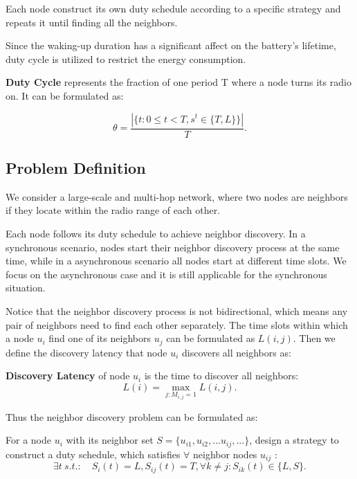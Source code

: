 Each node construct its own duty schedule according to a specific strategy and repeats it
until finding all the neighbors. 

Since the waking-up duration has a significant affect on the battery's lifetime, 
duty cycle is utilized to restrict the energy consumption.

\begin{definition}
\textbf{Duty Cycle} represents the fraction of one period T where a node turns its radio on. It can be formulated as:

$$\theta=\frac{|\{t: 0\leq t<T, s^t \in \{T,L\}\}|}{T}.
$$
\end{definition}  

\subsection{Problem Definition}

We consider a large-scale and multi-hop network, 
where two nodes are neighbors if they locate within the radio range of each other. 

Each node follows its duty schedule to achieve neighbor discovery. In a synchronous scenario,
nodes start their neighbor discovery process at the same time, while in a asynchronous  scenario
all nodes start at different time slots. We focus on the asynchronous case and it is still applicable for the
synchronous situation.

Notice that the neighbor discovery process is not bidirectional, which means any pair of neighbors 
need to find each other separately. The time slots within which a node $u_i$ find one of its neighbors $u_j$ can be formulated 
as $L(i,j)$. Then we define the discovery latency that node $u_i$ discovers all neighbors as:
\begin{definition}
\textbf{Discovery Latency} of node $u_i$ is the time to discover all neighbors:
$$L(i) = \max_{j:M_{i,j}=1} L(i,j).
$$
\end{definition}

Thus the neighbor discovery problem can be formulated as:
\begin{problem}
For a node $u_i$ with its neighbor set $S = \{u_{i1},u_{i2},...u_{ij},...\}$, 
design a strategy to construct a duty schedule, which satisfies
$\forall$ neighbor nodes $u_{ij}$ :
$$
\exists t \ s.t. :  \quad
S_i(t) = L ,
S_{ij}(t) = T,
\forall k \neq j : S_{ik}(t) \in \{L, S\}.
$$

\end{problem}

